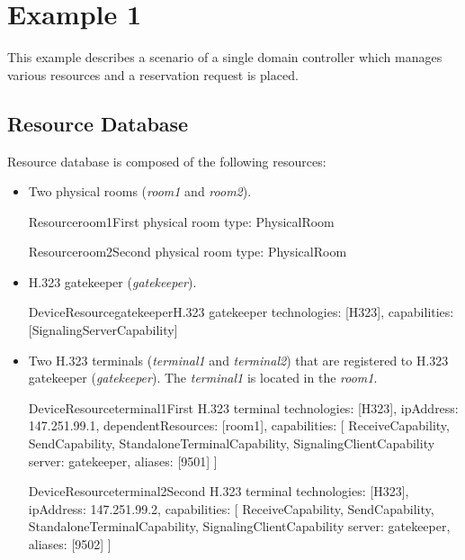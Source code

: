 \section{Example 1}

This example describes a scenario of a single domain controller which manages various resources and a reservation request is placed.

\subsection{Resource Database}

Resource database is composed of the following resources:
\begin{itemize}
\item Two physical rooms (\emph{room1} and \emph{room2}).

\begin{ResourceExample}{Resource}{room1}{First physical room}
type: PhysicalRoom
\end{ResourceExample}

\begin{ResourceExample}{Resource}{room2}{Second physical room}
type: PhysicalRoom
\end{ResourceExample}

\item H.323 gatekeeper (\emph{gatekeeper}).

\begin{ResourceExample}{DeviceResource}{gatekeeper}{H.323 gatekeeper}
technologies: [H323], 
capabilities: [SignalingServerCapability]
\end{ResourceExample}

\item Two H.323 terminals (\emph{terminal1} and \emph{terminal2}) that are
  registered to H.323 gatekeeper (\emph{gatekeeper}). The \emph{terminal1} is
  located in the \emph{room1}.
  
\begin{ResourceExample}{DeviceResource}{terminal1}{First H.323 terminal}
technologies: [H323], 
ipAddress: 147.251.99.1,
dependentResources: [room1],
capabilities: [
  ReceiveCapability, SendCapability,
  StandaloneTerminalCapability,
  SignalingClientCapability {server: gatekeeper, aliases: [9501]}
]
\end{ResourceExample}

\begin{ResourceExample}{DeviceResource}{terminal2}{Second H.323 terminal}
technologies: [H323], 
ipAddress: 147.251.99.2,
capabilities: [
  ReceiveCapability, SendCapability,
  StandaloneTerminalCapability,
  SignalingClientCapability {server: gatekeeper, aliases: [9502]}
]
\end{ResourceExample}


\end{itemize}
